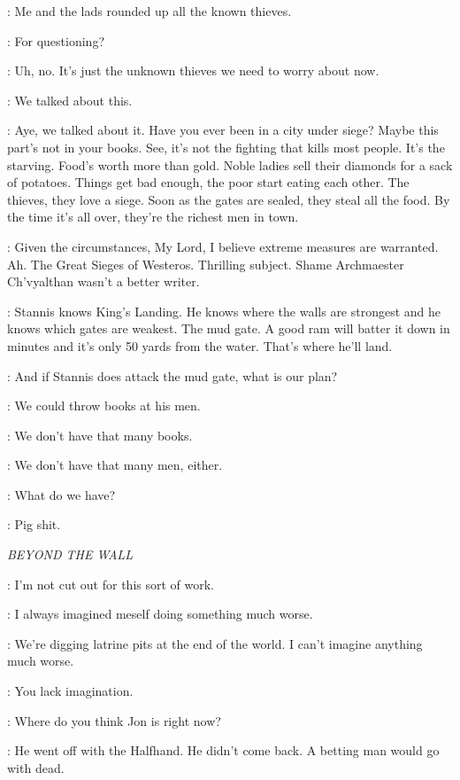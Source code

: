 \BRONN: Me and the lads rounded up all the known thieves. 

\TYRION: For questioning? 

\BRONN: Uh, no. It's just the unknown thieves we need to worry about now. 

\TYRION: We talked about this. 

\BRONN: Aye, we talked about it. Have you ever been in a city under siege? Maybe this part's not in your books. See, it's not the fighting that kills most people. It's the starving. Food's worth more than gold. Noble ladies sell their diamonds for a sack of potatoes. Things get bad enough, the poor start eating each other. The thieves, they love a siege. Soon as the gates are sealed, they steal all the food. By the time it's all over, they're the richest men in town. 

\VARYS: Given the circumstances, My Lord, I believe extreme measures are warranted. Ah. The Great Sieges of Westeros. 
Thrilling subject. Shame Archmaester Ch'vyalthan wasn't a better writer. 

\TYRION: Stannis knows King's Landing. He knows where the walls are strongest and he knows which gates are weakest. The mud gate. A good ram will batter it down in minutes and it's only 50 yards from the water. That's where he'll land. 

\VARYS: And if Stannis does attack the mud gate, what is our plan? 

\BRONN: We could throw books at his men. 

\VARYS: We don't have that many books. 

\BRONN: We don't have that many men, either. 

\VARYS: What do we have? 

\TYRION: Pig shit. 

\scene

\textit{BEYOND THE WALL} 


\SAM: I'm not cut out for this sort of work. 

\EDD: I always imagined meself doing something much worse. 

\GRENN: We're digging latrine pits at the end of the world. I can't imagine anything much worse. 

\EDD: You lack imagination. 

\SAM: Where do you think Jon is right now? 

\EDD: He went off with the Halfhand. He didn't come back. A betting man would go with dead. 

